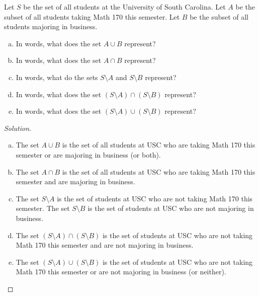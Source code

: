 \documentclass[12pt]{amsart}
\begin{document}
\begin{thm}[10 Points]\label{ex1}
  Let $S$ be the set of all students at the University of South Carolina.
  Let $A$ be the subset of all students taking Math 170 this semester.
  Let $B$ be the subset of all students majoring in business.
  \begin{enumerate}[(a)]
  \item
    In words, what does the set $A \cup B$ represent?
  \item
    In words, what does the set $A \cap B$ represent?
  \item
    In words, what do the sets $S \setminus A$ and $S \setminus B$ represent?
  \item
    In words, what does the set $\left(S \setminus A\right) \cap \left(S \setminus B\right)$ represent?
  \item
    In words, what does the set $\left(S \setminus A\right) \cup \left(S \setminus B\right)$ represent?
  \end{enumerate}
  \begin{proof}[Solution]
    \begin{enumerate}[(a)]
    \item
      The set $A \cup B$ is the set of all students at USC who are taking Math 170 this semester or are majoring in business (or both).
    \item
      The set $A \cap B$ is the set of all students at USC who are taking Math 170 this semester and are majoring in business.
    \item
      The set $S \setminus A$ is the set of students at USC who are not taking Math 170 this semester.
      The set $S \setminus B$ is the set of students at USC who are not majoring in business.
    \item
      The set $\left(S \setminus A\right) \cap \left(S \setminus B\right)$ is the set of students at USC who are not taking Math 170 this semester and are not majoring in business.
    \item
      The set $\left(S \setminus A\right) \cup \left(S \setminus B\right)$ is the set of students at USC who are not taking Math 170 this semester or are not majoring in business (or neither).
    \end{enumerate}
  \end{proof}
\end{thm}
\end{document}
